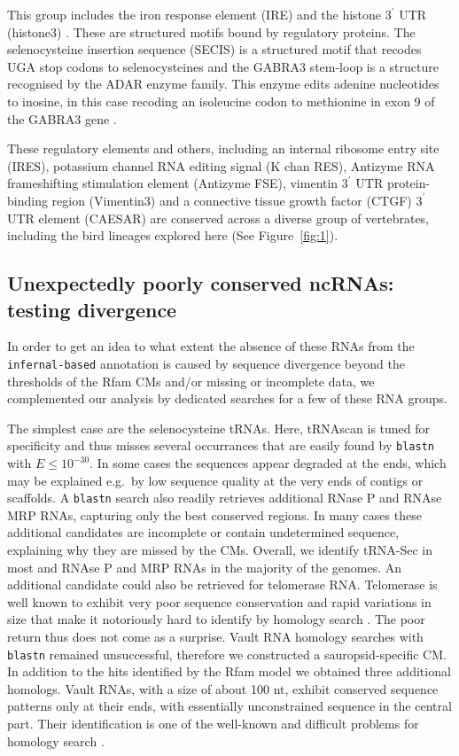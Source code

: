 \documentclass[10pt]{bmc_article}
\newenvironment{bmcformat}{\begin{raggedright}\baselineskip20pt\sloppy\setboolean{publ}{false}}{\end{raggedright}\baselineskip20pt\sloppy}
\begin{document}
\begin{bmcformat}
This group includes the iron response element (IRE) \cite{Stevens:}
and the histone $3^\prime$ UTR (histone3)
\cite{Davila_Lopez:2008a}. These are structured motifs bound by
regulatory proteins. The selenocysteine insertion sequence (SECIS) is
a structured motif that recodes UGA stop codons to selenocysteines
\cite{Lambert:2002} and the GABRA3 stem-loop is a structure recognised
by the ADAR enzyme family. This enzyme edits adenine nucleotides to
inosine, in this case recoding an isoleucine codon to methionine in
exon 9 of the GABRA3 gene \cite{Ohlson:2007}.

These regulatory elements and others, including an internal ribosome
entry site (IRES), potassium channel RNA editing signal (K chan RES),
Antizyme RNA frameshifting stimulation element (Antizyme FSE),
vimentin $3^\prime$ UTR protein-binding region (Vimentin3) and a
connective tissue growth factor (CTGF) $3^\prime$ UTR element (CAESAR)
are conserved across a diverse group of vertebrates, including the
bird lineages explored here (See Figure~\ref{fig:1}).

\subsection*{Unexpectedly poorly conserved  ncRNAs: testing divergence}

In order to get an idea to what extent the
absence of these RNAs from the \texttt{infernal-based} annotation is
caused by sequence divergence beyond the thresholds of the Rfam CMs
and/or missing or incomplete data, we complemented our analysis by
dedicated searches for a few of these RNA groups.

The simplest case are the selenocysteine tRNAs. Here, tRNAscan is
tuned for specificity and thus misses several occurrances that are
easily found by \texttt{blastn} with $E\le 10^{-30}$. In some cases
the sequences appear degraded at the ends, which may be explained
e.g.\ by low sequence quality at the very ends of contigs or
scaffolds. A \texttt{blastn} search also readily retrieves additional
RNase P and RNAse MRP RNAs, capturing only the best conserved
regions. In many cases these additional candidates are incomplete or
contain undetermined sequence, explaining why they are missed by the
CMs. Overall, we identify tRNA-Sec in most and RNAse P and MRP RNAs in
the majority of the genomes. An additional candidate could also be
retrieved for telomerase RNA. Telomerase is well known to exhibit very
poor sequence conservation and rapid variations in size that make it
notoriously hard to identify by homology search \cite{Xie:08a}. The
poor return thus does not come as a surprise. Vault RNA homology
searches with \texttt{blastn} remained unsuccessful, therefore we
constructed a sauropsid-specific CM.  In addition to the hits
identified by the Rfam model we obtained three additional
homologs. Vault RNAs, with a size of about 100 nt, exhibit conserved
sequence patterns only at their ends, with essentially unconstrained
sequence in the central part. Their identification is one of the
well-known and difficult problems for homology search
\cite{Stadler:09b,Kolbe:2009}.


\end{bmcformat}
\end{document}
